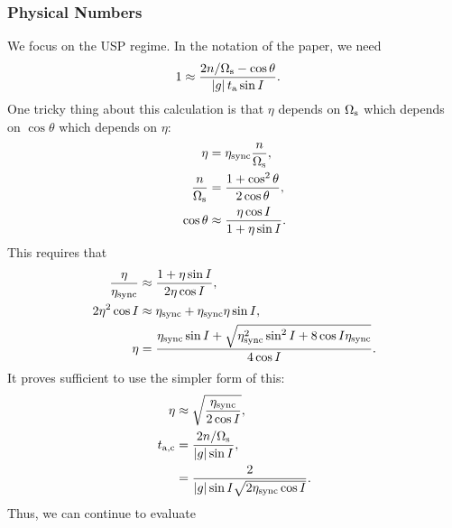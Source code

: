 \documentclass[11pt,
        usenames, %
        dvipsnames %
    ]{article}
\newcommand*{\abs}[1]{\left|#1\right|}
\begin{document}
\subsubsection{Physical Numbers}

We focus on the USP regime. In the notation of the paper, we need
\begin{align}
    1
        &\approx \frac{2n / \Omega_{\rm s} - \cos \theta
            }{\abs{g}t_{\rm a}\sin I}.
\end{align}
One tricky thing about this calculation is that $\eta$ depends on $\Omega_{\rm
s}$ which depends on $\cos \theta$ which depends on $\eta$:
\begin{align}
    \eta &= \eta_{\rm sync} \frac{n}{\Omega_{\rm s}},\\
    \frac{n}{\Omega_{\rm s}} &= \frac{1 + \cos^2\theta}{2 \cos \theta},\\
    \cos \theta &\approx \frac{\eta \cos I}{1 + \eta \sin I}.
\end{align}
This requires that
\begin{align}
    \frac{\eta}{\eta_{\rm sync}} &\approx \frac{1 + \eta \sin I
        }{2\eta \cos I},\\
    2\eta^2 \cos I &\approx \eta_{\rm sync} + \eta_{\rm sync}\eta \sin I,\\
    \eta &= \frac{\eta_{\rm sync}\sin I + \sqrt{
        \eta_{\rm sync}^2 \sin^2 I + 8\cos I \eta_{\rm sync}}}{
            4 \cos I}.
\end{align}
It proves sufficient to use the simpler form of this:
\begin{align}
    \eta &\approx \sqrt{\frac{\eta_{\rm sync}}{2\cos I}},\\
    t_{\rm a, c} &= \frac{2n / \Omega_{\rm s}}{\abs{g}\sin I},\\
        &= \frac{2}{\abs{g}\sin I\sqrt{2\eta_{\rm sync} \cos I}}.
\end{align}
Thus, we can continue to evaluate
\end{document}
